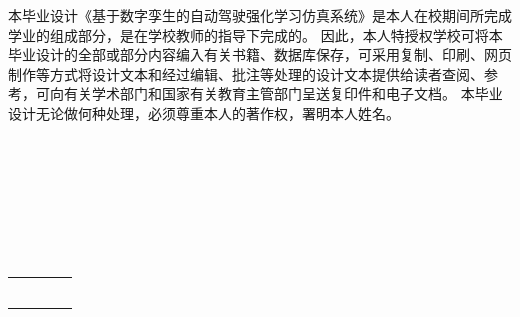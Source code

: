 
\begin{authorizationzh}
	
本毕业设计《基于数字孪生的自动驾驶强化学习仿真系统》是本人在校期间所完成学业的组成部分，是在学校教师的指导下完成的。
因此，本人特授权学校可将本毕业设计的全部或部分内容编入有关书籍、数据库保存，可采用复制、印刷、网页制作等方式将设计文本和经过编辑、批注等处理的设计文本提供给读者查阅、参考，可向有关学术部门和国家有关教育主管部门呈送复印件和电子文档。
本毕业设计无论做何种处理，必须尊重本人的著作权，署明本人姓名。
\\
\\
\\
\\
\\
\\
\\
\\

	
	\vspace{30pt}
	\begin{tabular}{llll}
		\makebox[4em][s]{设计作者（签字）} & \makebox[150pt][c]{  } & \makebox[2em][s]{时间} & \makebox[100pt][c]{\qquad 年\quad 月\quad   日 }\\
		\\ \\ \\
		\makebox[4em][s]{指导教师已阅（签字）} & \makebox[150pt][c]{  } & \makebox[2em][s]{时间} & \makebox[100pt][c]{\qquad 年\quad 月\quad   日 }\\
	\end{tabular}

	
	
\end{authorizationzh}